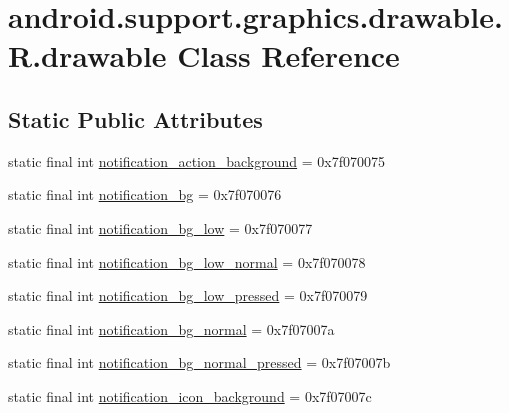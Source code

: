 \hypertarget{classandroid_1_1support_1_1graphics_1_1drawable_1_1_r_1_1drawable}{}\section{android.\+support.\+graphics.\+drawable.\+R.\+drawable Class Reference}
\label{classandroid_1_1support_1_1graphics_1_1drawable_1_1_r_1_1drawable}
\subsection*{Static Public Attributes}
\begin{DoxyCompactItemize}
\item 
static final int \mbox{\hyperlink{classandroid_1_1support_1_1graphics_1_1drawable_1_1_r_1_1drawable_a406ec3cf68ebdc6af7c204f382d49b19}{notification\+\_\+action\+\_\+background}} = 0x7f070075
\item 
static final int \mbox{\hyperlink{classandroid_1_1support_1_1graphics_1_1drawable_1_1_r_1_1drawable_af5fd5e375a2f7e28740270ae167381fd}{notification\+\_\+bg}} = 0x7f070076
\item 
static final int \mbox{\hyperlink{classandroid_1_1support_1_1graphics_1_1drawable_1_1_r_1_1drawable_a3e29d11ded19247c205235d18d5a5435}{notification\+\_\+bg\+\_\+low}} = 0x7f070077
\item 
static final int \mbox{\hyperlink{classandroid_1_1support_1_1graphics_1_1drawable_1_1_r_1_1drawable_a13c8698f9438958ffcb58dd92355d0fb}{notification\+\_\+bg\+\_\+low\+\_\+normal}} = 0x7f070078
\item 
static final int \mbox{\hyperlink{classandroid_1_1support_1_1graphics_1_1drawable_1_1_r_1_1drawable_a78dde7772b5ff823a2443632948f07bb}{notification\+\_\+bg\+\_\+low\+\_\+pressed}} = 0x7f070079
\item 
static final int \mbox{\hyperlink{classandroid_1_1support_1_1graphics_1_1drawable_1_1_r_1_1drawable_a48297e7e7d80122ef6353048d4a59eb8}{notification\+\_\+bg\+\_\+normal}} = 0x7f07007a
\item 
static final int \mbox{\hyperlink{classandroid_1_1support_1_1graphics_1_1drawable_1_1_r_1_1drawable_ae12eab972ee6c7697d3c8248b9507af6}{notification\+\_\+bg\+\_\+normal\+\_\+pressed}} = 0x7f07007b
\item 
static final int \mbox{\hyperlink{classandroid_1_1support_1_1graphics_1_1drawable_1_1_r_1_1drawable_aa9a6bfdcafe1f6d70796fcfe6e622eeb}{notification\+\_\+icon\+\_\+background}} = 0x7f07007c

\end{DoxyCompactItemize}
